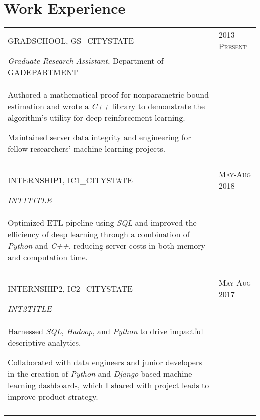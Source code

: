 \documentclass[a4paper,10pt]{article}
\begin{document}
\section{Work Experience}
\begin{supertabular}{p{13.9cm}>{\raggedleft\arraybackslash}p{3.4cm}}
	\textsc{GRADSCHOOL}, GS_CITYSTATE
	& \textsc{2013-Present} \\

	\small	\emph{Graduate Research Assistant}, \small Department of GADEPARTMENT & \\
	\begin{enumerate*}[label =$\circ$,itemjoin={\newline}]
		\item \footnotesize Authored a mathematical proof for nonparametric bound estimation and wrote a \emph{C++} library to demonstrate the algorithm's utility for deep reinforcement learning. 
		\item \footnotesize Maintained server data integrity and engineering for fellow researchers' machine learning projects.
	\end{enumerate*} & \\ 


	 \\

	\textsc{INTERNSHIP1}, IC1_CITYSTATE 
	& \textsc{May-Aug 2018} \\
	\small	\emph{INT1TITLE} & \\
	\begin{enumerate*}[label =$\circ$, itemjoin={\newline}]
		\item \footnotesize Optimized ETL pipeline using \emph{SQL} and improved the efficiency of deep learning through a combination of \emph{Python} and \emph{C++}, reducing server costs in both memory and computation time.
	\end{enumerate*} & \\
	 \\
	



	\textsc{INTERNSHIP2}, IC2_CITYSTATE 
	& \textsc{May-Aug 2017} \\
	\small	\emph{INT2TITLE} & \\
	\begin{enumerate*}[label =$\circ$, itemjoin={\newline}]
		\item \footnotesize Harnessed \emph{SQL}, \emph{Hadoop}, and \emph{Python} to drive impactful descriptive analytics.
		\item \footnotesize Collaborated with data engineers and junior developers in the creation of \emph{Python} and \emph{Django} based machine learning dashboards, which I shared with project leads to improve product strategy.
	\end{enumerate*} & \\
	 \\
	



\end{supertabular}
\end{document}
